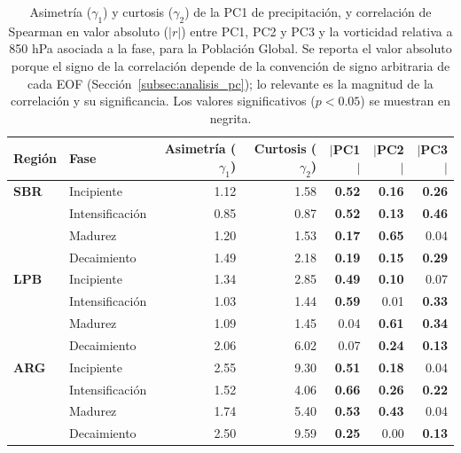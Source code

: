 \begin{table}[htbp]
\centering
\caption[Momentos estadísticos y correlación de PC1--PC3 de precipitación - Población Global]
{Asimetría ($\gamma_1$) y curtosis ($\gamma_2$) de la PC1 de precipitación, y correlación de Spearman en valor absoluto ($|r|$) entre PC1, PC2 y PC3 y la vorticidad relativa a 850 hPa asociada a la fase, para la Población Global. Se reporta el valor absoluto porque el signo de la correlación depende de la convención de signo arbitraria de cada EOF (Sección~\ref{subsec:analisis_pc}); lo relevante es la magnitud de la correlación y su significancia. Los valores significativos ($p<0.05$) se muestran en negrita.}
\label{tab:stat_global_tp}
\begin{tabular*}{\textwidth}{@{\extracolsep{\fill}}llrrrrr}
\hline
\textbf{Región} & \textbf{Fase} & \textbf{Asimetría ($\gamma_1$)} & \textbf{Curtosis ($\gamma_2$)} & \textbf{$|$PC1$|$} & \textbf{$|$PC2$|$} & \textbf{$|$PC3$|$} \\
\hline
\textbf{SBR} & Incipiente       & 1.12 & 1.58 & \textbf{0.52} & \textbf{0.16} & \textbf{0.26} \\
             & Intensificación & 0.85 & 0.87 & \textbf{0.52} & \textbf{0.13} & \textbf{0.46} \\
             & Madurez         & 1.20 & 1.53 & \textbf{0.17} & \textbf{0.65} & 0.04 \\
             & Decaimiento     & 1.49 & 2.18 & \textbf{0.19} & \textbf{0.15} & \textbf{0.29} \\
\hline
\textbf{LPB} & Incipiente       & 1.34 & 2.85 & \textbf{0.49} & \textbf{0.10} & 0.07 \\
             & Intensificación & 1.03 & 1.44 & \textbf{0.59} & 0.01 & \textbf{0.33} \\
             & Madurez         & 1.09 & 1.45 & 0.04 & \textbf{0.61} & \textbf{0.34} \\
             & Decaimiento     & 2.06 & 6.02 & 0.07 & \textbf{0.24} & \textbf{0.13} \\
\hline
\textbf{ARG} & Incipiente       & 2.55 & 9.30 & \textbf{0.51} & \textbf{0.18} & 0.04 \\
             & Intensificación & 1.52 & 4.06 & \textbf{0.66} & \textbf{0.26} & \textbf{0.22} \\
             & Madurez         & 1.74 & 5.40 & \textbf{0.53} & \textbf{0.43} & 0.04 \\
             & Decaimiento     & 2.50 & 9.59 & \textbf{0.25} & 0.00 & \textbf{0.13} \\
\hline
\end{tabular*}
\end{table}
